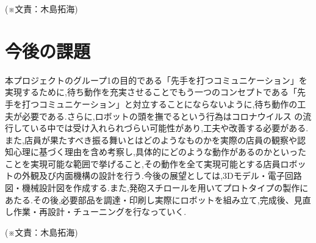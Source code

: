 \begin{flushright}
(※文責：木島拓海)
\end{flushright}

\section{今後の課題}
本プロジェクトのグループ1の目的である「先手を打つコミュニケーション」を実現するために,待ち動作を充実させることでもう一つのコンセプトである「先手を打つコミュニケーション」と対立することにならないように,待ち動作の工夫が必要である.さらに,ロボットの頭を撫でるという行為はコロナウイルス の流行している中では受け入れられづらい可能性があり,工夫や改善する必要がある.また,店員が果たすべき振る舞いとはどのようなものかを実際の店員の観察や認知心理に基づく理由を含め考察し,具体的にどのような動作があるのかといったことを実現可能な範囲で挙げること,その動作を全て実現可能とする店員ロボットの外観及び内面機構の設計を行う.今後の展望としては,3Dモデル・電子回路図・機械設計図を作成する.また,発砲スチロールを用いてプロトタイプの製作にあたる.その後,必要部品を調達・印刷し実際にロボットを組み立て,完成後、見直し作業・再設計・チューニングを行なっていく.
\begin{flushright}
(※文責：木島拓海)
\end{flushright}